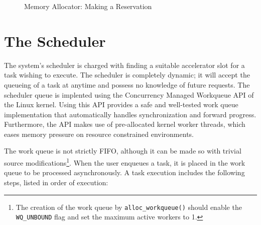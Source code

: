 \begin{figure}[htb!]
\caption{Memory Allocator: Making a Reservation}
\label{fig:allocator-reservation}
\end{figure}


\section{The Scheduler}
\label{sec:scheduler}

The system's scheduler is charged with finding a suitable accelerator slot 
for a task wishing to execute. The scheduler is completely dynamic; it
will accept the queueing of a task at anytime and possess no knowledge
of future requests. The scheduler queue is implented using the 
Concurrency Managed Workqueue API of the Linux kernel.
Using this API provides a safe and well-tested work queue implementation
that automatically handles synchronization and forward progress.
Furthermore, the API makes use of pre-allocated kernel worker threads,
which eases memory pressure on resource constrained environments.

The work queue is not strictly FIFO, although it can be made so with trivial source
modifications\footnote{The creation of the work queue by \texttt{alloc\_workqueue()}
should enable the \texttt{WQ\_UNBOUND} flag and set the maximum active workers to 1.}.
When the user enqueues a task, it is placed in the work queue to be processed asynchronously.
A task execution includes the following steps, listed in order of execution:

